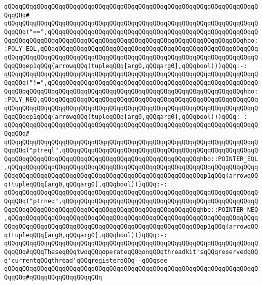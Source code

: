\verb|qQQqqQQqqQQqqQQqqQQqqQQqqQQqqQQqqQQqqQQqqQQqqQQqqQQqqQQqqQQqqQQqqQQqqQQqqQQq#|\newline
\verb|qQQqqQQqqQQqqQQqqQQqqQQqqQQqqQQqqQQqqQQqqQQqqQQqqQQqqQQqqQQqqQQqqQQqqQQqqQQq("==",qQQqqQQqqQQqqQQqqQQqqQQqqQQqqQQqqQQqqQQqqQQqqQQqqQQqqQQqqQQqqQQqqQQqqQQqqQQqqQQqqQQqqQQqqQQqqQQqqQQqqQQqqQQqqQQqqQQqqQQqqQQqhbo::POLY_EQL,qQQqqQQqqQQqqQQqqQQqqQQqqQQqqQQqqQQqqQQqqQQqqQQqqQQqqQQqqQQqqQQqqQQqqQQqqQQqqQQqqQQqqQQqqQQqqQQqqQQqqQQqqQQqqQQqqQQqqQQqqQQqqQQqqQQqqQQqep1qQQq(arrowqQQq(tupleqQQq[arg0,qQQqarg0],qQQqbool)))qQQq:-:|\newline
\verb|qQQqqQQqqQQqqQQqqQQqqQQqqQQqqQQqqQQqqQQqqQQqqQQqqQQqqQQqqQQqqQQqqQQqqQQqqQQq("!=",qQQqqQQqqQQqqQQqqQQqqQQqqQQqqQQqqQQqqQQqqQQqqQQqqQQqqQQqqQQqqQQqqQQqqQQqqQQqqQQqqQQqqQQqqQQqqQQqqQQqqQQqqQQqqQQqqQQqqQQqqQQqhbo::POLY_NEQ,qQQqqQQqqQQqqQQqqQQqqQQqqQQqqQQqqQQqqQQqqQQqqQQqqQQqqQQqqQQqqQQqqQQqqQQqqQQqqQQqqQQqqQQqqQQqqQQqqQQqqQQqqQQqqQQqqQQqqQQqqQQqqQQqqQQqqQQqep1qQQq(arrowqQQq(tupleqQQq[arg0,qQQqarg0],qQQqbool)))qQQq:-:|\newline
\verb|qQQqqQQqqQQqqQQqqQQqqQQqqQQqqQQqqQQqqQQqqQQqqQQqqQQqqQQqqQQqqQQqqQQqqQQqqQQq#|\newline
\verb|qQQqqQQqqQQqqQQqqQQqqQQqqQQqqQQqqQQqqQQqqQQqqQQqqQQqqQQqqQQqqQQqqQQqqQQqqQQq("ptreql",qQQqqQQqqQQqqQQqqQQqqQQqqQQqqQQqqQQqqQQqqQQqqQQqqQQqqQQqqQQqqQQqqQQqqQQqqQQqqQQqqQQqqQQqqQQqqQQqqQQqqQQqqQQqhbo::POINTER_EQL,qQQqqQQqqQQqqQQqqQQqqQQqqQQqqQQqqQQqqQQqqQQqqQQqqQQqqQQqqQQqqQQqqQQqqQQqqQQqqQQqqQQqqQQqqQQqqQQqqQQqqQQqqQQqqQQqqQQqqQQqqQQqp1qQQq(arrowqQQq(tupleqQQq[arg0,qQQqarg0],qQQqbool)))qQQq:-:|\newline
\verb|qQQqqQQqqQQqqQQqqQQqqQQqqQQqqQQqqQQqqQQqqQQqqQQqqQQqqQQqqQQqqQQqqQQqqQQqqQQq("ptrneq",qQQqqQQqqQQqqQQqqQQqqQQqqQQqqQQqqQQqqQQqqQQqqQQqqQQqqQQqqQQqqQQqqQQqqQQqqQQqqQQqqQQqqQQqqQQqqQQqqQQqqQQqqQQqhbo::POINTER_NEQ,qQQqqQQqqQQqqQQqqQQqqQQqqQQqqQQqqQQqqQQqqQQqqQQqqQQqqQQqqQQqqQQqqQQqqQQqqQQqqQQqqQQqqQQqqQQqqQQqqQQqqQQqqQQqqQQqqQQqqQQqqQQqp1qQQq(arrowqQQq(tupleqQQq[arg0,qQQqarg0],qQQqbool)))qQQq:-:|\newline
\newline
\verb|qQQqqQQqqQQqqQQqqQQqqQQqqQQqqQQqqQQqqQQqqQQqqQQqqQQqqQQqqQQqqQQqqQQqqQQqqQQq#qQQqTheseqQQqtwoqQQqoperateqQQqonqQQqthreadkit'sqQQqreservedqQQq'currentqQQqthread'qQQqregisterqQQq--qQQqsee|\newline
\verb|qQQqqQQqqQQqqQQqqQQqqQQqqQQqqQQqqQQqqQQqqQQqqQQqqQQqqQQqqQQqqQQqqQQqqQQqqQQq#qQQqqQQqqQQqqQQqqQQq|\newline
